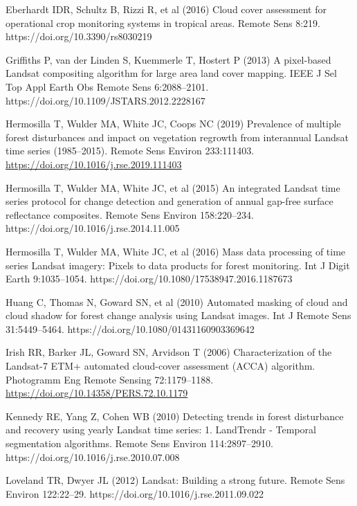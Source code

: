 \documentclass[
  letterpaper,
  DIV=11,
  numbers=noendperiod]{scrreprt}
\begin{document}
Eberhardt IDR, Schultz B, Rizzi R, et al (2016) Cloud cover assessment
for operational crop monitoring systems in tropical areas. Remote Sens
8:219. https://doi.org/10.3390/rs8030219

Griffiths P, van der Linden S, Kuemmerle T, Hostert P (2013) A
pixel-based Landsat compositing algorithm for large area land cover
mapping. IEEE J Sel Top Appl Earth Obs Remote Sens 6:2088--2101.
https://doi.org/10.1109/JSTARS.2012.2228167

Hermosilla T, Wulder MA, White JC, Coops NC (2019) Prevalence of
multiple forest disturbances and impact on vegetation regrowth from
interannual Landsat time series (1985--2015). Remote Sens Environ
233:111403.
\hspace{0pt}\hspace{0pt}\href{https://www.google.com/url?q=https://doi.org/10.1016/j.rse.2019.111403\&sa=D\&source=editors\&ust=1671458868185432\&usg=AOvVaw0FmmtQ4YjpNcI-HVcDozZ-}{https://doi.org/10.1016/j.rse.2019.111403}

Hermosilla T, Wulder MA, White JC, et al (2015) An integrated Landsat
time series protocol for change detection and generation of annual
gap-free surface reflectance composites. Remote Sens Environ
158:220--234. https://doi.org/10.1016/j.rse.2014.11.005

Hermosilla T, Wulder MA, White JC, et al (2016) Mass data processing of
time series Landsat imagery: Pixels to data products for forest
monitoring. Int J Digit Earth 9:1035--1054.
https://doi.org/10.1080/17538947.2016.1187673

Huang C, Thomas N, Goward SN, et al (2010) Automated masking of cloud
and cloud shadow for forest change analysis using Landsat images. Int J
Remote Sens 31:5449--5464. https://doi.org/10.1080/01431160903369642

Irish RR, Barker JL, Goward SN, Arvidson T (2006) Characterization of
the Landsat-7 ETM+ automated cloud-cover assessment (ACCA) algorithm.
Photogramm Eng Remote Sensing 72:1179--1188.
\href{https://www.google.com/url?q=https://doi.org/10.14358/PERS.72.10.1179\&sa=D\&source=editors\&ust=1671458868186784\&usg=AOvVaw0EDp98fBocaD-wesBTd-lm}{https://doi.org/10.14358/PERS.72.10.1179}

Kennedy RE, Yang Z, Cohen WB (2010) Detecting trends in forest
disturbance and recovery using yearly Landsat time series: 1. LandTrendr
- Temporal segmentation algorithms. Remote Sens Environ 114:2897--2910.
https://doi.org/10.1016/j.rse.2010.07.008

Loveland TR, Dwyer JL (2012) Landsat: Building a strong future. Remote
Sens Environ 122:22--29. https://doi.org/10.1016/j.rse.2011.09.022
\end{document}
